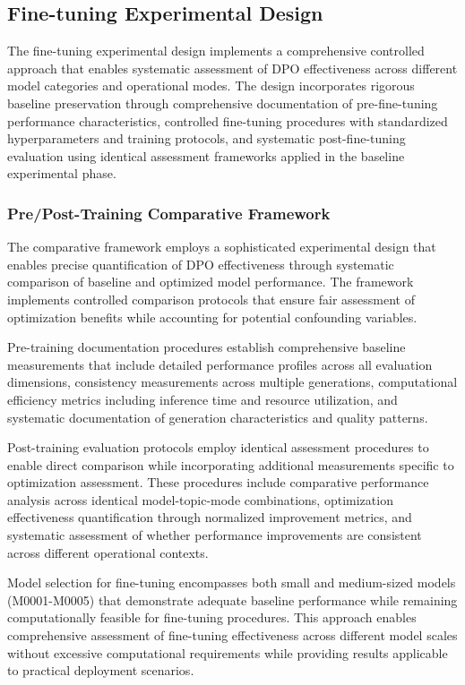 \subsection{Fine-tuning Experimental Design}

The fine-tuning experimental design implements a comprehensive controlled approach that enables systematic assessment of DPO effectiveness across different model categories and operational modes. The design incorporates rigorous baseline preservation through comprehensive documentation of pre-fine-tuning performance characteristics, controlled fine-tuning procedures with standardized hyperparameters and training protocols, and systematic post-fine-tuning evaluation using identical assessment frameworks applied in the baseline experimental phase.

\subsubsection{Pre/Post-Training Comparative Framework}

The comparative framework employs a sophisticated experimental design that enables precise quantification of DPO effectiveness through systematic comparison of baseline and optimized model performance. The framework implements controlled comparison protocols that ensure fair assessment of optimization benefits while accounting for potential confounding variables.

Pre-training documentation procedures establish comprehensive baseline measurements that include detailed performance profiles across all evaluation dimensions, consistency measurements across multiple generations, computational efficiency metrics including inference time and resource utilization, and systematic documentation of generation characteristics and quality patterns.

Post-training evaluation protocols employ identical assessment procedures to enable direct comparison while incorporating additional measurements specific to optimization assessment. These procedures include comparative performance analysis across identical model-topic-mode combinations, optimization effectiveness quantification through normalized improvement metrics, and systematic assessment of whether performance improvements are consistent across different operational contexts.

Model selection for fine-tuning encompasses both small and medium-sized models (M0001-M0005) that demonstrate adequate baseline performance while remaining computationally feasible for fine-tuning procedures. This approach enables comprehensive assessment of fine-tuning effectiveness across different model scales without excessive computational requirements while providing results applicable to practical deployment scenarios.

